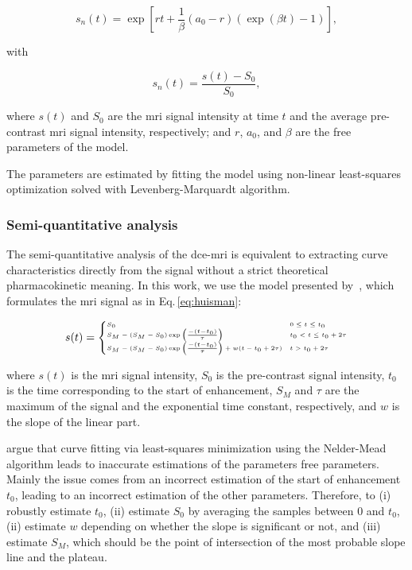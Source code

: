 \begin{equation}
  s_n(t) = \exp\left[rt + \frac{1}{\beta} \left( a_0 - r \right) \left( \exp(\beta t) - 1 \right) \right],
  \label{eq:pun}
\end{equation}

\noindent with

\begin{equation}
  s_n(t) = \frac{s(t) - S_0}{S_0},
  \label{eq:enh}
\end{equation}

\noindent where $s(t)$ and $S_0$ are the \ac{mri} signal intensity at
time $t$ and the average pre-contrast \ac{mri} signal intensity,
respectively; and $r$, $a_0$, and $\beta$ are the free parameters of the model.

The parameters are estimated by fitting the model using non-linear
least-squares optimization solved with Levenberg-Marquardt algorithm.

\subsubsection{Semi-quantitative analysis}\label{sec:semi}

The semi-quantitative analysis of the \ac{dce}-\ac{mri} is equivalent to extracting curve characteristics directly from the signal without a strict theoretical pharmacokinetic meaning.
In this work, we use the model presented by~\cite{huisman2001accurate}, which formulates the \ac{mri} signal as in Eq.\,\eqref{eq:huisman}:

\begin{equation}\tiny
  s(t) = \begin{cases}
    S_0 & 0 \leq t \leq t_0 \\
    S_M - (S_M - S_0) \exp\left( \frac{-(t - t_0)}{\tau} \right) & t_0 < t \leq t_0 + 2 \tau \\
    S_M - (S_M - S_0) \exp\left( \frac{-(t - t_0)}{\tau} \right) + w(t - t_0 + 2 \tau) & t > t_0 + 2 \tau
  \end{cases}
  \label{eq:huisman}
\end{equation}

\noindent where $s(t)$ is the \ac{mri} signal intensity, $S_0$ is the
pre-contrast signal intensity, $t_0$ is the time corresponding to the
start of enhancement, $S_M$ and $\tau$ are the maximum of the signal
and the exponential time constant, respectively, and $w$ is the slope of the linear part.

\citeauthor{huisman2001accurate} argue that curve fitting via
least-squares minimization using the Nelder-Mead algorithm leads to
inaccurate estimations of the parameters free parameters.
Mainly the issue comes from an incorrect estimation of the start of
enhancement $t_0$, leading to an incorrect estimation of the other parameters.
Therefore, \citeauthor{huisman2001accurate} to
(i) robustly estimate $t_0$,
(ii) estimate $S_0$ by averaging the samples between $0$ and $t_0$,
(ii) estimate $w$ depending on whether the slope is significant or
not, and
(iii) estimate $S_M$, which should be the point of intersection of the most probable slope line and the plateau.

